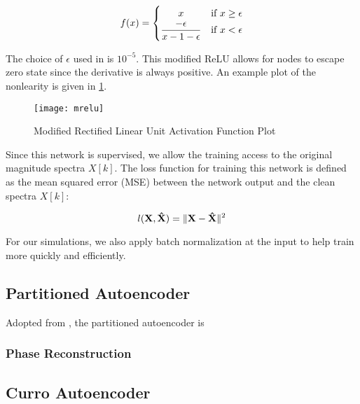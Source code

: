 \begin{equation}
f(x) =
    \begin{cases}
        \hfill x \hfill & \text{if $x \ge \epsilon$}\\
        \hfill \dfrac{-\epsilon}{x-1-\epsilon} & \text{if $x < \epsilon$}
    \end{cases}
\end{equation}

The choice of $\epsilon$ used in \cite{liu2014experiments} is $10^{-5}$. This modified ReLU allows for nodes to escape zero state since the derivative is always positive. An example plot of the nonlearity is given in \ref{fig:mrelu}.

\begin{figure}[!ht]
\centering
\texttt{[image: mrelu]}
\caption[Modified Rectified Linear Unit Activation]{Modified Rectified Linear Unit Activation Function Plot}
\label{fig:mrelu}
\end{figure}

Since this network is supervised, we allow the training access to the original magnitude spectra $X[k]$. The loss function for training this network is defined as the mean squared error (MSE) between the network output and the clean spectra $X[k]$:

\begin{equation}
l(\mathbf{X},\mathbf{\hat{X}}) = \lVert\mathbf{X}-\mathbf{\hat{X}}\rVert^{2}
\end{equation}

For our simulations, we also apply batch normalization at the input to help train more quickly and efficiently.

\subsection{Partitioned Autoencoder}

Adopted from \cite{stow}, the partitioned autoencoder is

\subsubsection{Phase Reconstruction}

\subsection{Curro Autoencoder}


